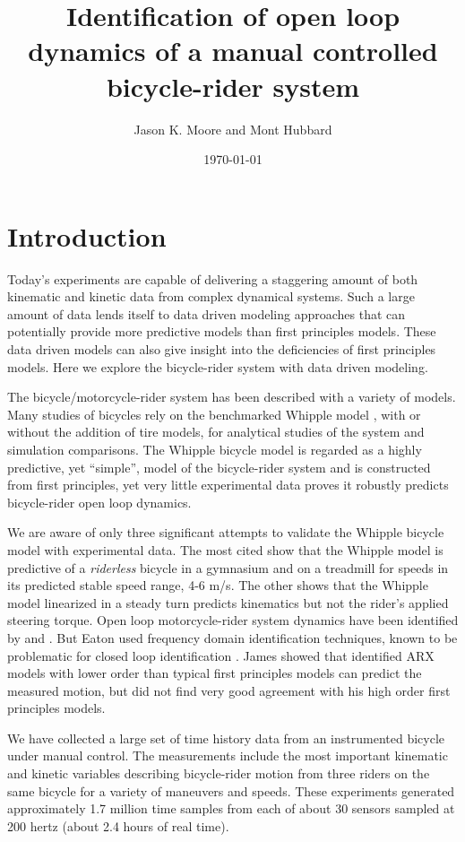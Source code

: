 \documentclass[a4paper]{article}
\title{Identification of open loop dynamics of a manual controlled
bicycle-rider system}
\author{Jason K. Moore and Mont Hubbard}
\date{\today}
\begin{document}
\maketitle

\section*{Introduction}

Today's experiments are capable of delivering a staggering amount of both
kinematic and kinetic data from complex dynamical systems. Such a large amount
of data lends itself to data driven modeling approaches that can potentially
provide more predictive models than first principles models. These data driven
models can also give insight into the deficiencies of first principles models.
Here we explore the bicycle-rider system with data driven modeling.

The bicycle/motorcycle-rider system has been described with a variety of
models. Many studies of bicycles rely on the benchmarked Whipple model
\cite{Meijaard2007}, with or without the addition of tire models, for
analytical studies of the system and simulation comparisons. The Whipple
bicycle model \cite{Whipple1899} is regarded as a highly predictive, yet
``simple'', model of the bicycle-rider system and is constructed from first
principles, yet very little experimental data proves it robustly predicts
bicycle-rider open loop dynamics.

We are aware of only three significant attempts to validate the Whipple bicycle
model with experimental data. The most cited \cite{Kooijman2008,Kooijman2009}
show that the Whipple model is predictive of a \emph{riderless} bicycle in a
gymnasium and on a treadmill for speeds in its predicted stable speed range,
4-6 m/s. The other \cite{Cain2012} shows that the Whipple model linearized in a
steady turn predicts kinematics but not the rider's applied steering torque.
Open loop motorcycle-rider system dynamics have been identified by
\cite{Eaton1973} and \cite{James2002,James2005}. But Eaton used frequency
domain identification techniques, known to be problematic for closed loop
identification \cite{Ljung1999}. James showed that identified ARX models with
lower order than typical first principles models can predict the measured
motion, but did not find very good agreement with his high order first
principles models.

We have collected a large set of time history data from an instrumented bicycle
under manual control. The measurements include the most important kinematic and
kinetic variables describing bicycle-rider motion from three riders on the same
bicycle for a variety of maneuvers and speeds. These experiments generated
approximately 1.7 million time samples from each of about 30 sensors sampled at
200 hertz (about 2.4 hours of real time).
\end{document}

